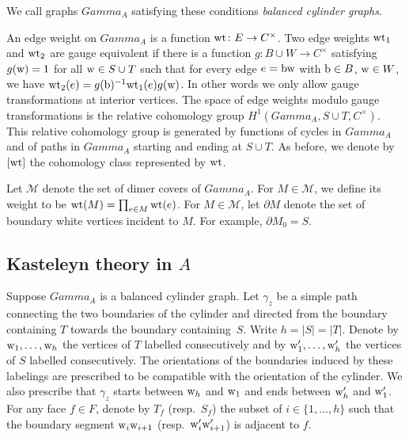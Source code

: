 \documentclass[10pt,a4paper]{amsart}
\numberwithin{equation}{section}
\newcommand{\bcg}{{balanced cylinder graph}}
\newcommand{\C}{{\mathbb C}}
\newcommand{\A}{{\mathbb A}}
\newcommand{\ra}{\rightarrow}
\newcommand{\w}{{\rm w}}
\newcommand{\bw}{{\rm b}}
\newcommand{\wt}{{\rm wt}}
\def\boldsymbol#1{#1}
\def\A{A}
\def\Gamma{Gamma}
\def\C{C}
\begin{document}
	
	
	We call graphs $\Gamma_\A$ satisfying these conditions \emph{{\bcg }s}.
	
	
	An edge weight on $\Gamma_\A$ is a function $\wt\colon E \ra \C^\times$. Two edge weights ${\rm wt}_1$ and ${\rm wt}_2$ are gauge equivalent if there is a function $g\colon B \cup W \ra \C^\times$ satisfying $g(\w)=1$ for all $\w \in S \cup T$ such that for every edge $e=\bw \w$ with ${\rm b} \in B$, ${\rm w}\in W$, we have ${\rm wt}_2(e)=g({\rm b})^{-1} {\rm wt}_1(e) g({\rm w}) $. In other words we only allow gauge transformations at interior vertices. The space of edge weights modulo gauge transformations is the relative cohomology group $H^1(\Gamma_\A, S \cup T,\C^\times)$. {This relative cohomology group is generated by functions of cycles in $\Gamma_\A$ and of paths in $\Gamma_\A$ starting and ending at $S\cup T$.}
	As before, we denote by $[{\rm wt}]$ the cohomology class represented by ${\rm wt}$.
	
	Let $\mathcal M$ denote the set of dimer covers of $\Gamma_\A$. For $M \in \mathcal M$, we define its {weight} to be $\wt(M)=\prod_{e \in M} \wt(e)$. For $M \in \mathcal M$, let $\partial M$ denote the set of boundary white vertices incident to $M$. For example, $\partial M_0=S$.
	
\subsection[Kasteleyn theory in A]{Kasteleyn theory in $\boldsymbol{\A}$}
	\label{subsec:Kasteleyncylinder}
	
Suppose $\Gamma_\A$ is a \bcg. Let $\gamma_z$ be a simple path connecting the two boundaries of the cylinder and directed from the boundary containing $T$ towards the boundary containing~$S$. Write $h=|S|=|T|$. Denote by $\w_1,\dots,\w_h$ the vertices of $T$ labelled consecutively and by $\w'_1,\dots,\w'_h$ the vertices of $S$ labelled consecutively. The orientations of the boundaries induced by these labelings are prescribed to be compatible with the orientation of the cylinder. We also prescribe that $\gamma_z$ starts between $\w_h$ and $\w_1$ and ends between $\w'_h$ and $\w'_1$. For any face $f\in F$, denote by $T_f$ (resp.\ $S_f$) the subset of $i\in \{1,\dots,h\}$ such that the boundary segment $\w_i\w_{i+1}$ \big(resp.\ $\w'_i \w'_{i+1}$\big) is adjacent to $f$.
	
\end{document}

